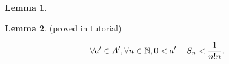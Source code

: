 \documentclass{homework}
\newcommand{\T}[1]{\text{#1}}
\newcommand{\N}{\bb{N}} %
\newcommand{\?}{\stackrel{?}{=}}
\theoremstyle{definition}
\newtheorem{lemma}{Lemma}
\begin{document}
\begin{lemma}
\end{lemma}
\begin{lemma}
 (proved in tutorial)
 
$$\forall a'\in A', \forall n\in\N, 0<a'-S_n<\frac{1}{n!n}.$$


\end{lemma}
\end{document}
